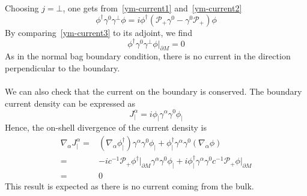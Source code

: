 Choosing $j = \bot$, one gets from~\cref{ym-current1} and~\cref{ym-current2}
\begin{equation}\label{ym-current3}
\phi^\dagger\gamma^0\gamma^\bot\phi = i\phi^\dagger(\mathcal{P}_+\gamma^0 - \gamma^0\mathcal{P}_+)\phi  
\end{equation}
By comparing~\cref{ym-current3} to its adjoint, we find
\begin{equation*}
\phi^\dagger\gamma^0\gamma^\bot\phi\vert_{\partial M} = 0
\end{equation*}
As in the normal bag boundary condition, there is no current in the direction perpendicular to the boundary. \\\\
We can also check that the current on the boundary is conserved. 
The boundary current density can be expressed as
\begin{equation*}
J_|^\alpha = i \phi_|\gamma^\alpha\gamma^0\phi_|
\end{equation*}
Hence, the on-shell divergence of the current density is
\begin{equation*}
\begin{split}
\nabla_\alpha J_|^\alpha  = & (\nabla_\alpha\phi_|^\dagger)\gamma^\alpha\gamma^0\phi_| + \phi_|^\dagger\gamma^\alpha\gamma^0(\nabla_\alpha\phi) \\
= &
-ic^{-1}\mathcal{P}_+\phi^\dagger\vert_{\partial M} \gamma^\alpha\gamma^0\phi_| + i\phi_|^\dagger\gamma^\alpha\gamma^0 c^{-1}\mathcal{P}_+\phi\vert_{\partial M} \\
= & 0
\end{split}
\end{equation*}
This result is expected as there is no current coming from the bulk.















